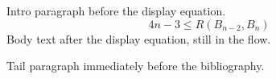 \documentclass{article}
\begin{document}
Intro paragraph before the display equation.
\[
  4n-3 \le R(B_{n-2},B_n)
\]
Body text after the display equation, still in the flow.

Tail paragraph immediately before the bibliography.


\end{document}
